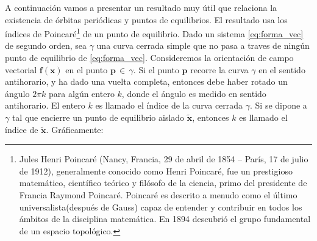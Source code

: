\documentclass[10pt]{article}
\begin{document}
A continuación vamos a presentar un resultado muy útil que relaciona la existencia de órbitas periódicas y puntos de equilibrios. El resultado usa los índices de Poincaré\footnote{Jules Henri Poincaré (Nancy, Francia, 29 de abril de 1854 – París, 17 de julio de 1912), generalmente conocido como Henri Poincaré, fue un prestigioso matemático, científico teórico y filósofo de la ciencia, primo del presidente de Francia Raymond Poincaré. Poincaré es descrito a menudo como el último
universalista(después de Gauss) capaz de entender y contribuir en todos los ámbitos de la disciplina matemática. En 1894 descubrió el grupo fundamental de un espacio topológico.} de un punto de equilibrio. Dado un sistema \eqref{eq:forma_vec} de segundo orden, sea $\gamma$ una curva cerrada simple que no pasa a traves de ningún punto de equilibrio de \eqref{eq:forma_vec}. Consideremos la orientación de campo vectorial $\mathbf{f}(\mathbf{x})$ en el punto $\mathbf{p} \, \in \, \gamma$. Si el punto $\mathbf{p}$ recorre la curva $\gamma$ en el sentido antihorario, y ha dado una vuelta  completa, entonces debe haber rotado un ángulo $2 \pi k$ para algún entero $k$, donde el ángulo es medido en sentido antihorario. El entero $k$ es llamado el índice de la curva cerrada $\gamma$. Si se dipone a $\gamma$ tal que encierre un punto de equilibrio aislado $\tilde{\mathbf{x}}$, entonces $k$ es llamado el índice de $\tilde{\mathbf{x}}$. 
Gráficamente:
\end{document}
